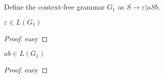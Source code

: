 \begin{definition}\label{def:mygrammar}
  \leanok
Define the context-free grammar $G_1$ as $S \to \varepsilon | a S b$.
\end{definition}

\begin{theorem}\label{thm:my_second_theorem}
  \leanok
  $\varepsilon \in L(G_1)$
\end{theorem}
\begin{proof}
  \leanok
  easy
\end{proof}

\begin{theorem}\label{thm:my_third_theorem}
  \leanok
  $ab \in L(G_1)$
\end{theorem}
\begin{proof}
  \leanok
  easy
\end{proof}



